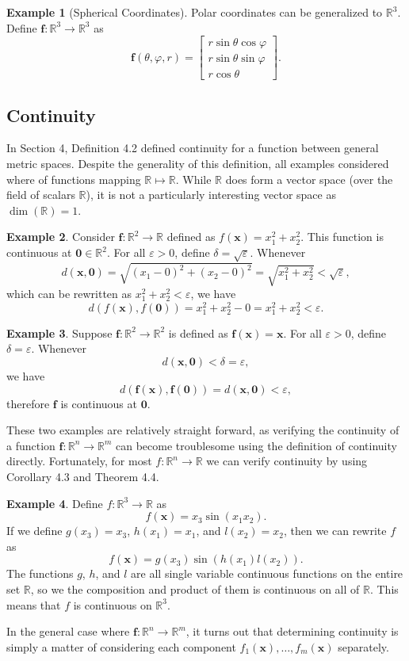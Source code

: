 \documentclass{article}
\newcommand{\R}{\mathbb{R}}
\newcommand{\x}{\mathbf{x}}
\newcommand{\f}{\mathbf{f}}
\newcommand{\ze}{\mathbf{0}}
\theoremstyle{definition}
\newtheorem{example}{Example}[section]
\begin{document}
	\begin{example}[Spherical Coordinates]
		Polar coordinates can be generalized to $ \R^3 $. Define $ \f:\R^3\to\R^3 $ as 
		$$ \f(\theta, \varphi, r) =\begin{bmatrix}
			r\sin \theta\cos\varphi\\r\sin \theta\sin\varphi\\ r\cos\theta
		\end{bmatrix}  .$$ 
	\end{example}
	
	\subsection{Continuity}
	In Section 4, Definition 4.2 defined continuity for a function between general metric spaces. Despite the generality of this definition, all examples considered where of functions mapping $ \R\mapsto\R $. While $ \R $ does form a vector space (over the field of scalars $ \R $), it is not a particularly interesting vector space as $ \dim(\R) = 1$. 
	\begin{example}
		Consider $ \f:\R^2\to\R $ defined as $ f(\x)=x_1^2 + x_2^2 $. This function is continuous at $ \ze \in \R^2 $. For all $ \varepsilon > 0 $, define $ \delta = \sqrt{\varepsilon} $. Whenever $$ d(\x, \ze) = \sqrt{(x_1 - 0)^2 + (x_2 - 0)^2} = \sqrt{x_1^2 + x_2^2} < \sqrt{\varepsilon}, $$ which can be rewritten as $ x_1^2 + x_2^2 < \varepsilon$, we have 
		$$d(f(\x),f(\ze)) = x_1^2 + x_2^2 - 0 = x_1^2 + x_2^2 < \varepsilon.$$
	\end{example}
	
	\begin{example}
		Suppose $\f:\R^2 \to \R^2 $ is defined as $ \f(\x)=\x $. For all $ \varepsilon>0 $, define $ \delta = \varepsilon $. Whenever 
		$$ d(\x,\ze) < \delta = \varepsilon,$$ we have $$ d(\f(\x), \f(\ze)) = d(\x,\ze) < \varepsilon,$$ therefore $ \f $ is continuous at $ \ze $. 
	\end{example}
	These two examples are relatively straight forward, as verifying the continuity of a function $ \f:\R^n\to\R^m $ can become troublesome using the definition of continuity directly. Fortunately, for most $ f:\R^n\to\R $ we can verify continuity by using Corollary 4.3 and Theorem 4.4.
	\begin{example}
		Define $ f:\R^3\to\R $ as $$f(\x)=x_3\sin(x_1x_2) .$$
		If we define $ g(x_3)=x_3 $, $ h(x_1)=x_1 $, and $ l(x_2)=x_2 $, then we can rewrite $ f $ as $$f(\x)=g(x_3)\sin(h(x_1)l(x_2)) .$$ The functions $ g $, $ h $, and $ l $ are all single variable continuous functions on the entire set $ \R $, so we the composition and product of them is continuous on all of $ \R $. This means that $ f $ is continuous on $ \R^3 $.  
	\end{example}
	In the general case where $ \f:\R^n\to\R^m $, it turns out that determining continuity is simply a matter of considering each component $ f_1(\x),\ldots,f_m(\x) $ separately. 
	
\end{document}
